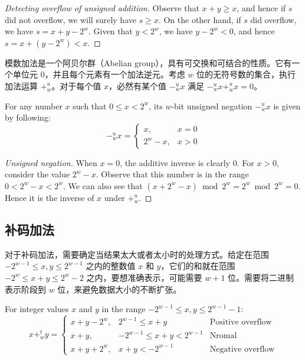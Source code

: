 \begin{proof}[Detecting overflow of unsigned addition]
    Observe that $x + y \geq x$, and hence if $s$ did not overflow, we will surely have $s \geq x$. On the other hand, if $s$ did overflow, we have $s = x + y - 2^w$. Given that $y < 2^w$, we have $y - 2^w < 0$, and hence $s = x + (y - 2^w) < x$.
\end{proof}

模数加法是一个阿贝尔群（Abelian group），具有可交换和可结合的性质。它有一个单位元 $0$，并且每个元素有一个加法逆元。考虑 $w$ 位的无符号数的集合，执行加法运算 $+^u_w$。对于每个值 $x$，必然有某个值 $-^u_wx$ 满足 $-^u_wx +^u_wx = 0$。

\begin{theorem}
    For any number $x$ such that $0 \leq x < 2^w$, its $w$-bit unsigned negation $-^u_wx$ is given by following:
    \begin{equation}
        -^u_wx = \left\{
        \begin{array}{ll}
            x, & x = 0 \\
            2^w - x, & x > 0
        \end{array}
        \right.
        \label{thm:negu}
    \end{equation}
\end{theorem}

\begin{proof}[Unsigned negation]
    When $x = 0$, the additive inverse is clearly $0$. For $x > 0$, consider the value $2^w - x$. Observe that this number is in the range $ 0 < 2^w - x < 2^w$. We can also see that $(x + 2^w -x ) \bmod 2^w = 2^w \bmod 2^w = 0$. Hence it is the inverse of $x$ under $+^u_w$.
\end{proof}

\subsection{补码加法}

对于补码加法，需要确定当结果太大或者太小时的处理方式。给定在范围 $-2^{w-1} \leq x, y \leq 2^{w-1}$ 之内的整数值 $x$ 和 $y$，它们的和就在范围 $-2^w \leq x + y \leq 2^w - 2$ 之内，要想准确表示，可能需要 $w + 1$ 位。需要将二进制表示阶段到 $w$ 位，来避免数据大小的不断扩张。

\begin{theorem}
    For integer values $x$ and $y$ in the range $-2^{w-1} \leq x, y \leq 2^{w-1}-1$:
    \begin{equation}
        x +^t_w y = \left\{
        \begin{array}{lll}
            x + y - 2^w, & 2^{w-1} \leq x + y & \text{Positive overflow} \\
            x + y, & -2^{w-1} \leq x + y < 2^{w-1} & \text{Nromal} \\
            x + y + 2^w, & x + y < -2^{w-1} & \text{Negative overflow}
        \end{array}
        \right.
        \label{thm:adds}
    \end{equation}
\end{theorem}

